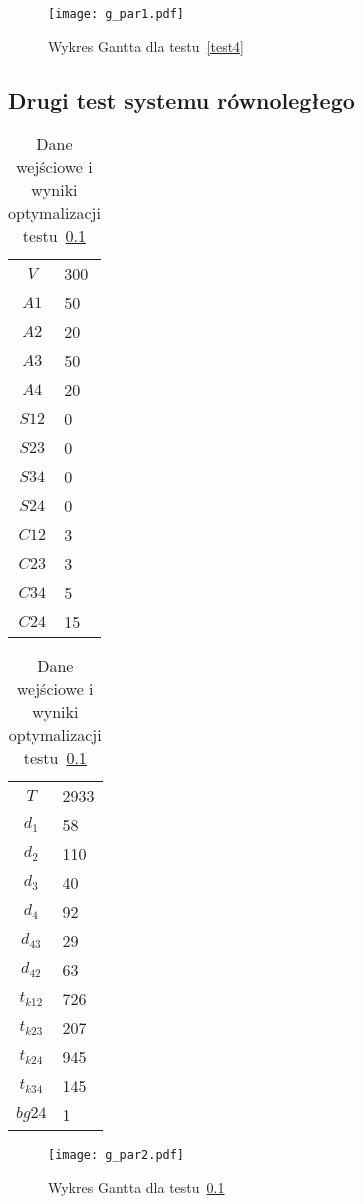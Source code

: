 \begin{figure}[H]
\centering
\texttt{[image: g\_par1.pdf]}
\caption{Wykres Gantta dla testu~\ref{test4}}
\label{fig:res_4b}
\end{figure}

\subsection{Drugi test systemu równoległego} \label{test5}

\begin{table}[H]
\begin{minipage}[b]{0.5\linewidth}
\centering
\begin{tabular}{c l}
$V$ & 300 \\
$A1$ & 50 \\
$A2$ & 20 \\
$A3$ & 50 \\
$A4$ & 20 \\
$S12$ & 0 \\
$S23$ & 0 \\
$S34$ & 0 \\
$S24$ & 0 \\
$C12$ & 3 \\
$C23$ & 3 \\
$C34$ & 5 \\
$C24$ & 15 \\
\end{tabular}
\end{minipage}
\hspace{0.5cm}
\begin{minipage}[b]{0.5\linewidth}
\centering
\begin{tabular}{c l}
$T$ & 2933 \\
$d_{1}$ & 58 \\
$d_{2}$ & 110 \\
$d_{3}$ & 40 \\
$d_{4}$ & 92 \\
$d_{43}$ & 29 \\
$d_{42}$ & 63 \\
$t_{k12}$ & 726 \\
$t_{k23}$ & 207 \\
$t_{k24}$ & 945 \\
$t_{k34}$ & 145 \\
$bg24$ & 1 \\
\end{tabular}
\end{minipage}
\caption{Dane wejściowe i wyniki optymalizacji testu~\ref{test5}}
\label{tab:res_5a}
\end{table}

\begin{figure}[H]
\centering
\texttt{[image: g\_par2.pdf]}
\caption{Wykres Gantta dla testu~\ref{test5}}
\label{fig:res_5b}
\end{figure}

\newpage
